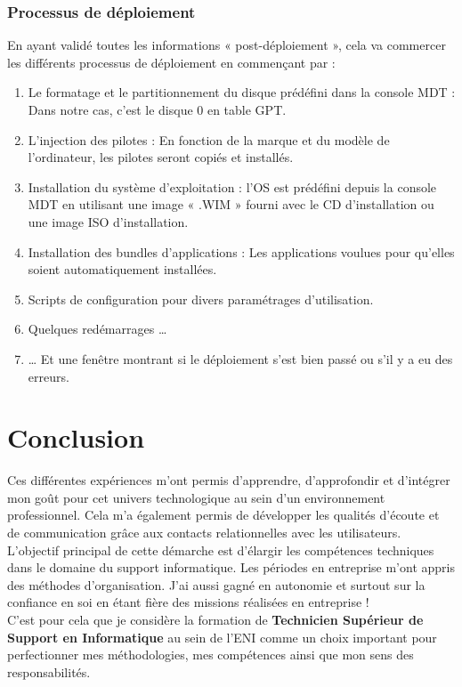 \documentclass[11pt,a4paper,twoside]{article}
\begin{document}
\subsubsection{Processus de déploiement}
En ayant validé toutes les informations « post-déploiement », cela va commercer les différents processus de déploiement en commençant par : \\
\begin{enumerate}
    \item Le formatage et le partitionnement du disque prédéfini dans la console MDT : Dans notre cas, c’est le disque 0 en table GPT.
    \item L’injection des pilotes : En fonction de la marque et du modèle de l’ordinateur, les pilotes seront copiés et installés.
    \item Installation du système d’exploitation : l’OS est prédéfini depuis la console MDT en utilisant une image « .WIM » fourni avec le CD d’installation ou une image ISO d’installation.
    \item Installation des bundles d’applications : Les applications voulues pour qu’elles soient automatiquement installées.
    \item Scripts de configuration pour divers paramétrages d’utilisation.
    \item Quelques redémarrages …
    \item … Et une fenêtre montrant si le déploiement s’est bien passé ou s’il y a eu des erreurs.
\end{enumerate}	

\newpage

\section{Conclusion}
Ces différentes expériences m’ont permis d’apprendre, d’approfondir et d’intégrer mon goût pour cet univers technologique au sein d’un environnement professionnel. Cela m’a également permis de développer les qualités d’écoute et de communication grâce aux contacts relationnelles avec les utilisateurs. \\

L’objectif principal de cette démarche est d’élargir les compétences techniques dans le domaine du support informatique. Les périodes en entreprise m’ont appris des méthodes d’organisation. J’ai aussi gagné en autonomie et surtout sur la confiance en soi en étant fière des missions réalisées en entreprise ! \\

C’est pour cela que je considère la formation de \textbf{Technicien Supérieur de Support en Informatique} au sein de l’ENI comme un choix important pour perfectionner mes méthodologies, mes compétences ainsi que mon sens des responsabilités. \\
\end{document}
